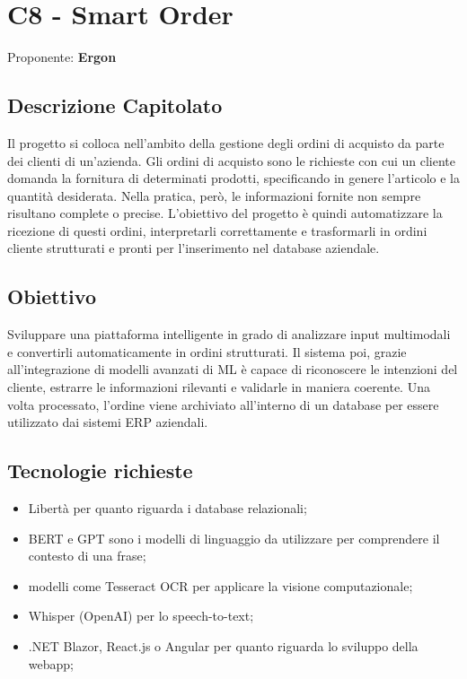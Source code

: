 \documentclass[a4paper,12pt]{article}
\begin{document}
\section{C8 - Smart Order}{
    Proponente: \textbf{Ergon}
    \subsection*{Descrizione Capitolato}{
        Il progetto si colloca nell'ambito della gestione degli ordini di acquisto da parte dei clienti di un'azienda. Gli ordini di acquisto sono le richieste con cui un cliente domanda la fornitura di determinati prodotti, specificando in genere l'articolo e la quantità desiderata. Nella pratica, però, le informazioni fornite non
        sempre risultano complete o precise. L'obiettivo del progetto è quindi automatizzare la ricezione di questi ordini, interpretarli correttamente e trasformarli in ordini cliente strutturati e pronti per l'inserimento nel database aziendale.
    }

    \subsection*{Obiettivo}{
        Sviluppare una piattaforma intelligente in grado di analizzare input multimodali e convertirli automaticamente in ordini strutturati. Il sistema poi, grazie all'integrazione di modelli avanzati di ML è capace di riconoscere le intenzioni del cliente, estrarre le informazioni rilevanti e validarle in maniera coerente. Una volta processato, l'ordine viene archiviato all'interno di un database per essere utilizzato dai sistemi ERP aziendali.
    }

    \subsection*{Tecnologie richieste}{
        \begin{itemize}
            \item Libertà per quanto riguarda i database relazionali;
            \item BERT e GPT sono i modelli di linguaggio da utilizzare per comprendere il contesto di una frase;
            \item modelli come Tesseract OCR per applicare la visione computazionale;
            \item Whisper (OpenAI) per lo speech-to-text;
            \item .NET Blazor, React.js o Angular per quanto riguarda lo sviluppo della webapp;
        \end{itemize}
    }

}
\end{document}
